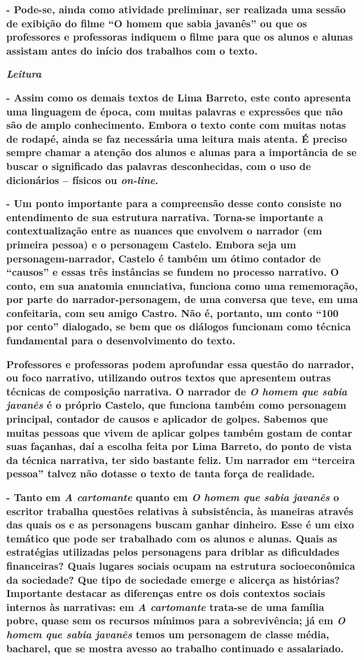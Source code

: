 \textbf{- Pode-se, ainda como atividade preliminar, ser realizada uma
sessão de exibição do filme ``O homem que sabia javanês'' ou que os
professores e professoras indiquem o filme para que os alunos e alunas
assistam antes do início dos trabalhos com o texto.}

\emph{\textbf{Leitura}}

\textbf{- Assim como os demais textos de Lima Barreto, este conto
apresenta uma linguagem de época, com muitas palavras e expressões que
não são de amplo conhecimento. Embora o texto conte com muitas notas de
rodapé, ainda se faz necessária uma leitura mais atenta. É preciso
sempre chamar a atenção dos alunos e alunas para a importância de se
buscar o significado das palavras desconhecidas, com o uso de
dicionários -- físicos ou ­\emph{on-line}. }

\textbf{- Um ponto importante para a compreensão desse conto consiste no
entendimento de sua estrutura narrativa. Torna-se importante a
contextualização entre as nuances que envolvem o narrador (em primeira
pessoa) e o personagem Castelo. Embora seja um personagem-narrador,
Castelo é também um ótimo contador de ``causos'' e essas três instâncias
se fundem no processo narrativo. O conto, em sua anatomia enunciativa,
funciona como uma rememoração, por parte do narrador-personagem, de uma
conversa que teve, em uma confeitaria, com seu amigo Castro. Não é,
portanto, um conto ``100 por cento'' dialogado, se bem que os diálogos
funcionam como técnica fundamental para o desenvolvimento do texto. }

\textbf{Professores e professoras podem aprofundar essa questão do
narrador, ou foco narrativo, utilizando outros textos que apresentem
outras técnicas de composição narrativa. O narrador de \emph{O homem que
sabia javanês} é o próprio Castelo, que funciona também como personagem
principal, contador de causos e aplicador de golpes. Sabemos que muitas
pessoas que vivem de aplicar golpes também gostam de contar suas
façanhas, daí a escolha feita por Lima Barreto, do ponto de vista da
técnica narrativa, ter sido bastante feliz. Um narrador em ``terceira
pessoa'' talvez não dotasse o texto de tanta força de realidade.}

\textbf{- Tanto em \emph{A cartomante} quanto em \emph{O homem que sabia
javanês} o escritor trabalha questões relativas à subsistência, às
maneiras através das quais os e as personagens buscam ganhar dinheiro.
Esse é um eixo temático que pode ser trabalhado com os alunos e alunas.
Quais as estratégias utilizadas pelos personagens para driblar as
dificuldades financeiras? Quais lugares sociais ocupam na estrutura
socioeconômica da sociedade? Que tipo de sociedade emerge e alicerça as
histórias? Importante destacar as diferenças entre os dois contextos
sociais internos às narrativas: em \emph{A cartomante} trata-se de uma
família pobre, quase sem os recursos mínimos para a sobrevivência; já em
\emph{O homem que sabia javanês} temos um personagem de classe média,
bacharel, que se mostra avesso ao trabalho continuado e assalariado.}

